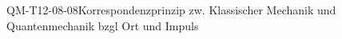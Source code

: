 
\begin{CONC}{QM-T12-08-08}{Korrespondenzprinzip zw. Klassischer Mechanik und Quantenmechanik bzgl Ort und Impuls}
\end{CONC}

